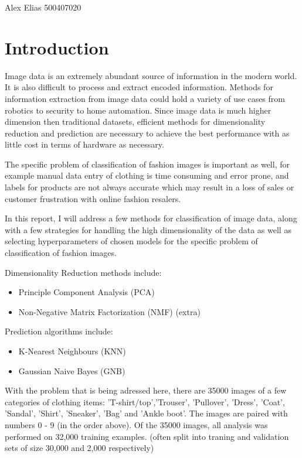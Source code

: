 \documentclass[11pt]{article}
\author{Alex Elias}
\date{\today}
\title{}
\begin{document}
\tableofcontents

Alex Elias 500407020

\section{Introduction}
\label{sec:orgbc75115}

Image data is an extremely abundant source of information in the modern world. It is also difficult to process and extract encoded information. Methods for information extraction from image data could hold a variety of use cases from robotics to security to home automation. Since image data is much higher dimension then traditional datasets, efficient methods for dimensionality reduction and prediction are necessary to achieve the best performance with as little cost in terms of hardware as necessary.

The specific problem of classification of fashion images is important as well, for example manual data entry of clothing is time consuming and error prone, and labels for products are not always accurate which may result in a loss of sales or customer frustration with online fashion resalers.

In this report, I will address a few methods for classification of image data, along with a few strategies for handling the high dimensionality of the data as well as selecting hyperparameters of chosen models for the specific problem of classification of fashion images.

Dimensionality Reduction methods include:
\begin{itemize}
\item Principle Component Analysis (PCA)
\item Non-Negative Matrix Factorization (NMF) (extra)
\end{itemize}

Prediction algorithms include:
\begin{itemize}
\item K-Nearest Neighbours (KNN)
\item Gaussian Naive Bayes (GNB)
\end{itemize}

With the problem that is being adressed here, there are 35000 images of a few categories of clothing items: 'T-shirt/top','Trouser', 'Pullover', 'Dress', 'Coat', 'Sandal', 'Shirt', 'Sneaker', 'Bag' and 'Ankle boot'. The images are paired with numbers 0 - 9 (in the order above). Of the 35000 images, all analysis was performed on 32,000 training examples. (often split into traning and validation sets of size 30,000 and 2,000 respectively)
\end{document}

